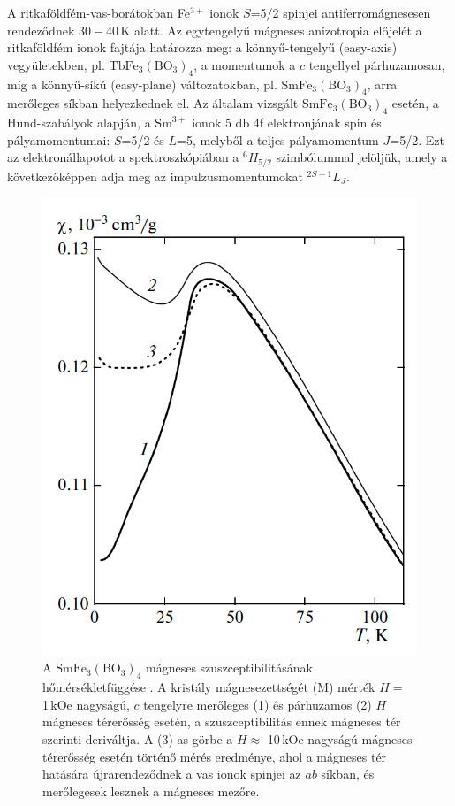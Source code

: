 \documentclass[a4paper,12pt]{article}
\numberwithin{equation}{section}
\begin{document}
A ritkaföldfém-vas-borátokban Fe$^{3+}$ ionok $S$=5/2 spinjei antiferromágnesesen rendeződnek $30-40\,$K alatt. Az egytengelyű mágneses anizotropia előjelét a ritkaföldfém ionok fajtája határozza meg: a könnyű-tengelyű (easy-axis) vegyületekben, pl. $\mathrm{TbFe}_3(\mathrm{BO}_3)_4$, a momentumok a $c$ tengellyel párhuzamosan, míg a könnyű-síkú (easy-plane) változatokban, pl. $\mathrm{SmFe}_3(\mathrm{BO}_3)_4$, arra merőleges síkban helyezkednek el. Az általam vizsgált $\mathrm{SmFe}_3(\mathrm{BO}_3)_4$ esetén, a Hund-szabályok alapján, a $\mathrm{Sm}^{3+}$ ionok 5 db 4f elektronjának spin és pályamomentumai: $S$=5/2 és $L$=5, melyből a teljes pályamomentum $J$=5/2. Ezt az elektronállapotot a spektroszkópiában a $^6H_{5/2}$ szimbólummal jelöljük, amely a következőképpen adja meg az  impulzusmomentumokat $^{2S+1}L_J$.





 \begin{figure}[H]
\begin{center}
\includegraphics[width=7 cm]{kristalymágnesestul/szucc.png}
\end{center}
\caption {A $\mathrm{SmFe_3(BO_3)_4}$ mágneses szuszceptibilitásának hőmérsékletfüggése \cite{2010_JETP}. A kristály mágnesezettségét (M) mérték $H=$ 1\,kOe nagyságú, $c$ tengelyre merőleges (1) és párhuzamos (2) $H$ mágneses térerősség esetén, a szuszceptibilitás ennek mágneses tér szerinti deriváltja. A (3)-as görbe a $H\approx$ 10\,kOe nagyságú mágneses térerősség esetén történő mérés eredménye, ahol a mágneses tér hatására újrarendeződnek a vas ionok spinjei az $ab$ síkban, és merőlegesek lesznek a mágneses mezőre.}
\label{fig:szucc}
\end{figure}
\end{document}
